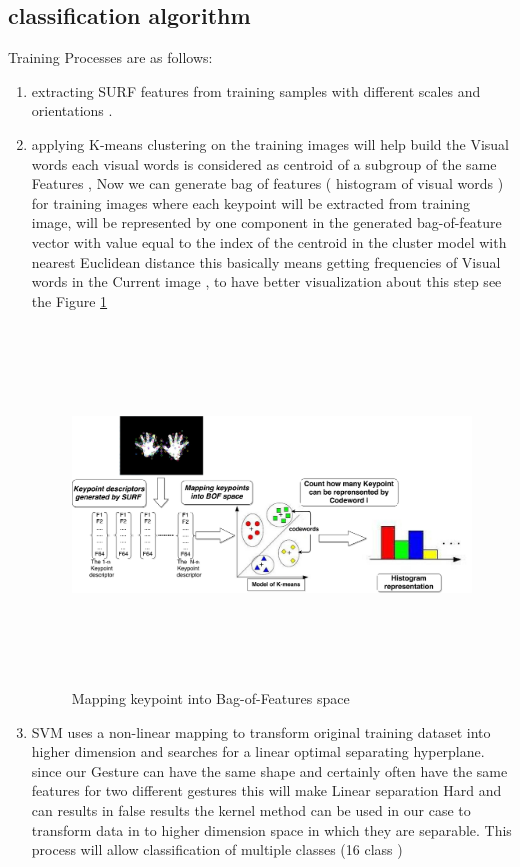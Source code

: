 \subsection{classification algorithm }

Training Processes are as follows:





\begin{enumerate}
 \item extracting SURF features from training samples with different scales and  orientations .
 \item applying  K-means clustering on the training images will help build the Visual words each visual words is considered as centroid of a subgroup of the same Features , Now we can generate bag of features ( histogram of visual words ) for training images where each keypoint will be extracted from training image, will be represented by one component in the generated bag-of-feature vector with value equal to the index of the centroid in the cluster model with nearest Euclidean
distance this basically means getting frequencies of Visual words in the Current image , to have better visualization  about this step see the Figure \ref{fig:histo}

\begin{figure}[H]
\centering
\includegraphics[width=18cm, height=9.5cm ]{img/histogramprocess.pdf}
\caption{Mapping keypoint into Bag-of-Features space }
\label{fig:histo}
\end{figure}

\item SVM uses a non-linear mapping to transform original training dataset into higher dimension and searches for a linear optimal
separating hyperplane. since our Gesture can have the same shape and certainly often have the same features for two different gestures  this will make Linear separation Hard and can results in false results the kernel method can be used in our case  to transform data  in to higher dimension space in which they are separable. This process will allow classification of multiple classes (16 class ) 
\end{enumerate}

